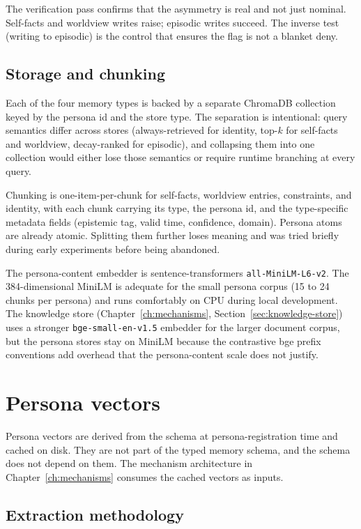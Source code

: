 The verification pass confirms that the asymmetry is real and not just nominal. Self-facts and worldview writes raise; episodic writes succeed. The inverse test (writing to episodic) is the control that ensures the flag is not a blanket deny.

\subsection{Storage and chunking}

Each of the four memory types is backed by a separate ChromaDB collection\autocite{chromadb} keyed by the persona id and the store type. The separation is intentional: query semantics differ across stores (always-retrieved for identity, top-$k$ for self-facts and worldview, decay-ranked for episodic), and collapsing them into one collection would either lose those semantics or require runtime branching at every query.

Chunking is one-item-per-chunk for self-facts, worldview entries, constraints, and identity, with each chunk carrying its type, the persona id, and the type-specific metadata fields (epistemic tag, valid time, confidence, domain). Persona atoms are already atomic. Splitting them further loses meaning and was tried briefly during early experiments before being abandoned.

The persona-content embedder is sentence-transformers \texttt{all-MiniLM-L6-v2}. The 384-dimensional MiniLM is adequate for the small persona corpus (15 to 24 chunks per persona) and runs comfortably on CPU during local development. The knowledge store (Chapter~\ref{ch:mechanisms}, Section~\ref{sec:knowledge-store}) uses a stronger \texttt{bge-small-en-v1.5} embedder for the larger document corpus, but the persona stores stay on MiniLM because the contrastive bge prefix conventions add overhead that the persona-content scale does not justify\autocite{bgeembed2023}.

\section{Persona vectors}
\label{sec:architecture-pvectors}

Persona vectors are derived from the schema at persona-registration time and cached on disk. They are not part of the typed memory schema, and the schema does not depend on them. The mechanism architecture in Chapter~\ref{ch:mechanisms} consumes the cached vectors as inputs.

\subsection{Extraction methodology}

